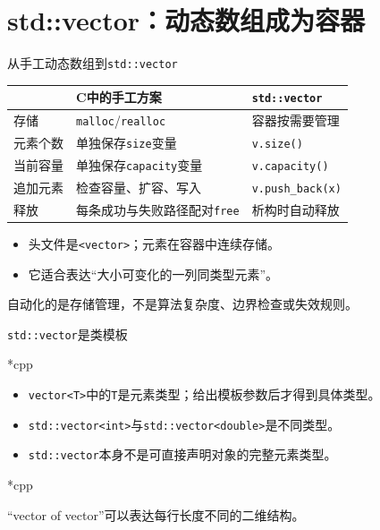 \section{std::vector：动态数组成为容器}

\begin{frame}{从手工动态数组到\texttt{std::vector}}
\small
\setlength{\tabcolsep}{5pt}
\renewcommand{\arraystretch}{1.3}
\begin{tabular}{p{}p{}p{}}
 & \textbf{C中的手工方案} & \textbf{\texttt{std::vector}}\\
\hline
存储 & \texttt{malloc}/\texttt{realloc} & 容器按需要管理\\
元素个数 & 单独保存\texttt{size}变量 & \texttt{v.size()}\\
当前容量 & 单独保存\texttt{capacity}变量 & \texttt{v.capacity()}\\
追加元素 & 检查容量、扩容、写入 & \texttt{v.push\_back(x)}\\
释放 & 每条成功与失败路径配对\texttt{free} & 析构时自动释放
\end{tabular}

\medskip\normalsize
\begin{itemize}
\item 头文件是\texttt{<vector>}；元素在容器中连续存储。
\item 它适合表达“大小可变化的一列同类型元素”。
\end{itemize}
\alert{自动化的是存储管理，不是算法复杂度、边界检查或失效规则。}
\end{frame}

\begin{frame}{\texttt{std::vector}是类模板}
\begin{Code}*{cpp}\end{Code}
\begin{itemize}
\item \texttt{vector<T>}中的\texttt{T}是元素类型；给出模板参数后才得到具体类型。
\item \texttt{std::vector<int>}与\texttt{std::vector<double>}是不同类型。
\item \texttt{std::vector}本身不是可直接声明对象的完整元素类型。
\end{itemize}
\medskip
\begin{Code}*{cpp}\end{Code}
\small “vector of vector”可以表达每行长度不同的二维结构。
\end{frame}

